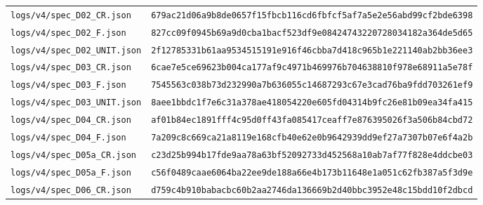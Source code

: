\documentclass[11pt,a4paper]{article}
\newcommand{\loc}[1]{\nolinkurl{#1}}
\theoremstyle{plain}
\theoremstyle{definition}
\theoremstyle{remark}
\numberwithin{equation}{section}
\begin{document}
\begin{longtable}{@{}L{.50\linewidth}L{.44\linewidth}@{}}
{\footnotesize\loc{logs/v4/spec_D02_CR.json}} & \texttt{\scriptsize 679ac21d06a9b8de0657f15fbcb116cd}\newline\texttt{\scriptsize 6fbfcf5af7a5e2e56abd99cf2bde6398}\\
{\footnotesize\loc{logs/v4/spec_D02_F.json}} & \texttt{\scriptsize 827cc09f0945b69a9d0cba1bacf523df}\newline\texttt{\scriptsize 9e08424743220728034182a364de5d65}\\
{\footnotesize\loc{logs/v4/spec_D02_UNIT.json}} & \texttt{\scriptsize 2f12785331b61aa9534515191e916f46}\newline\texttt{\scriptsize cbba7d418c965b1e221140ab2bb36ee3}\\
{\footnotesize\loc{logs/v4/spec_D03_CR.json}} & \texttt{\scriptsize 6cae7e5ce69623b004ca177af9c4971b}\newline\texttt{\scriptsize 469976b704638810f978e68911a5e78f}\\
{\footnotesize\loc{logs/v4/spec_D03_F.json}} & \texttt{\scriptsize 7545563c038b73d232990a7b636055c1}\newline\texttt{\scriptsize 4687293c67e3cad76ba9fdd703261ef9}\\
{\footnotesize\loc{logs/v4/spec_D03_UNIT.json}} & \texttt{\scriptsize 8aee1bbdc1f7e6c31a378ae418054220}\newline\texttt{\scriptsize e605fd04314b9fc26e81b09ea34fa415}\\
{\footnotesize\loc{logs/v4/spec_D04_CR.json}} & \texttt{\scriptsize af01b84ec1891fff4c95d0ff43fa0854}\newline\texttt{\scriptsize 17ceaff7e876395026f3a506b84cbd72}\\
{\footnotesize\loc{logs/v4/spec_D04_F.json}} & \texttt{\scriptsize 7a209c8c669ca21a8119e168cfb40e62}\newline\texttt{\scriptsize e0b9642939dd9ef27a7307b07e6f4a2b}\\
{\footnotesize\loc{logs/v4/spec_D05a_CR.json}} & \texttt{\scriptsize c23d25b994b17fde9aa78a63bf520927}\newline\texttt{\scriptsize 33d452568a10ab7af77f828e4ddcbe03}\\
{\footnotesize\loc{logs/v4/spec_D05a_F.json}} & \texttt{\scriptsize c56f0489caae6064ba22ee9de188a66e}\newline\texttt{\scriptsize 4b173b11648e1a051c62fb387a5f3d9e}\\
{\footnotesize\loc{logs/v4/spec_D06_CR.json}} & \texttt{\scriptsize d759c4b910babacbc60b2aa2746da136}\newline\texttt{\scriptsize 669b2d40bbc3952e48c15bdd10f2dbcd}\\

\end{longtable}
\end{document}
